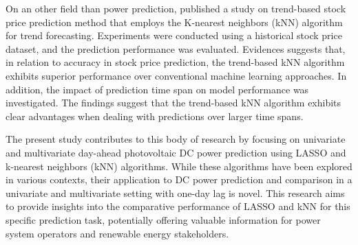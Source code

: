 On an other field than power prediction, \citet{Gao_2023} published a study on trend-based stock price prediction method that employs the K-nearest neighbors (kNN) algorithm for trend forecasting. Experiments were conducted using a historical stock price dataset, and the prediction performance was evaluated. Evidences suggests that, in relation to accuracy in stock price prediction, the trend-based kNN algorithm exhibits superior performance over conventional machine learning approaches. In addition, the impact of prediction time span on model performance was investigated. The findings suggest that the trend-based kNN algorithm exhibits clear advantages when dealing with predictions over larger time spans.

The present study contributes to this body of research by focusing on univariate and multivariate day-ahead photovoltaic DC power prediction using LASSO and k-nearest neighbors (kNN) algorithms. While these algorithms have been explored in various contexts, their application to DC power prediction and comparison in a univariate and multivariate setting with one-day lag is novel. This research aims to provide insights into the comparative performance of LASSO and kNN for this specific prediction task, potentially offering valuable information for power system operators and renewable energy stakeholders.
